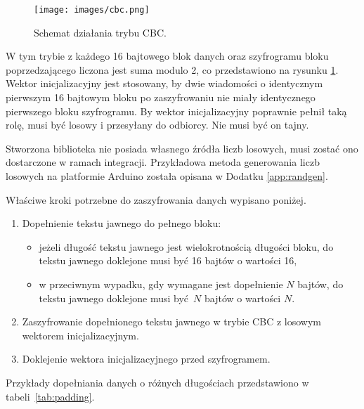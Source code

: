 \begin{figure}[h]
\centering
\texttt{[image: images/cbc.png]}
\caption{Schemat działania trybu CBC.}
\label{fig:cbc}
\end{figure}

W tym trybie z każdego 16 bajtowego blok danych oraz szyfrogramu bloku poprzedzającego liczona jest suma modulo 2, co przedstawiono na rysunku \ref{fig:cbc}. Wektor inicjalizacyjny jest stosowany, by dwie wiadomości o identycznym pierwszym 16 bajtowym bloku po zaszyfrowaniu nie miały identycznego pierwszego bloku szyfrogramu. By wektor inicjalizacyjny poprawnie pełnił taką rolę, musi być losowy i przesyłany do odbiorcy. Nie musi być on tajny.

Stworzona biblioteka nie posiada własnego źródła liczb losowych, musi zostać ono dostarczone w ramach integracji. Przykładowa metoda generowania liczb losowych na platformie Arduino została opisana w Dodatku \ref{app:randgen}.

Właściwe kroki potrzebne do zaszyfrowania danych wypisano poniżej.

\begin{enumerate}
\item Dopełnienie tekstu jawnego do pełnego bloku:
\begin{itemize}
\item jeżeli długość tekstu jawnego jest wielokrotnością długości bloku, do tekstu jawnego doklejone musi być 16 bajtów o wartości 16,
\item w przeciwnym wypadku, gdy wymagane jest dopełnienie $ N $ bajtów, do tekstu jawnego doklejone musi być $ N $ bajtów o wartości $ N $.
\end{itemize}
\item Zaszyfrowanie dopełnionego tekstu jawnego w trybie CBC z losowym wektorem inicjalizacyjnym.
\item Doklejenie wektora inicjalizacyjnego przed szyfrogramem.
\end{enumerate}

Przykłady dopełniania danych o różnych długościach przedstawiono w tabeli~\ref{tab:padding}.

